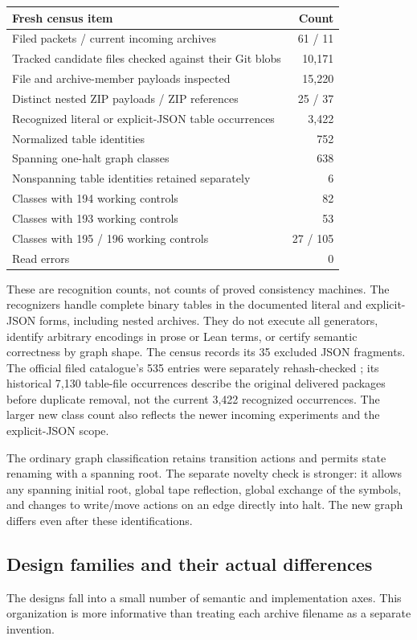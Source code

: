 \documentclass[11pt]{article}
\begin{document}
\begin{center}
\begin{tabular}{@{}lr@{}}
\toprule
Fresh census item & Count\\
\midrule
Filed packets / current incoming archives & 61 / 11\\
Tracked candidate files checked against their Git blobs & 10,171\\
File and archive-member payloads inspected & 15,220\\
Distinct nested ZIP payloads / ZIP references & 25 / 37\\
Recognized literal or explicit-JSON table occurrences & 3,422\\
Normalized table identities & 752\\
Spanning one-halt graph classes & 638\\
Nonspanning table identities retained separately & 6\\
Classes with 194 working controls & 82\\
Classes with 193 working controls & 53\\
Classes with 195 / 196 working controls & 27 / 105\\
Read errors & 0\\
\bottomrule
\end{tabular}
\end{center}
These are recognition counts, not counts of proved consistency machines.
The recognizers handle complete binary tables in the documented literal
and explicit-JSON forms, including nested archives. They do not execute all
generators, identify arbitrary encodings in prose or Lean terms, or certify
semantic correctness by graph shape. The census records its 35 excluded
JSON fragments. The official filed catalogue's 535 entries were separately
rehash-checked \cite{catalogue}; its historical 7,130 table-file occurrences describe the
original delivered packages before duplicate removal, not the current
3,422 recognized occurrences. The larger new class count also reflects
the newer incoming experiments and the explicit-JSON scope.

The ordinary graph classification retains transition actions and permits
state renaming with a spanning root. The separate novelty check is stronger:
it allows any spanning initial root, global tape reflection, global exchange
of the symbols, and changes to write/move actions on an edge directly into
halt. The new graph differs even after these identifications.

\subsection{Design families and their actual differences}
The designs fall into a small number of semantic and implementation axes.
This organization is more informative than treating each archive filename
as a separate invention.
\end{document}
